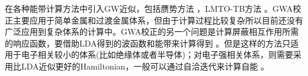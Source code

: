 {在各种能带计算方法中引入GW近似，包括赝势方法%
，LMTO-TB方法%
。GWA校正主要应用于简单金属和过渡金属体系，但由于计算过程比较复杂所以目前还没有广泛应用到复杂体系的计算中。GWA校正的另一个问题是计算屏蔽相互作用所需的响应函数，要借助LDA得到的波函数和能带来计算得到%
。但是这样的方法只适用于电子相关较小的体系(比如绝缘体或者半导体)；对电子强相关体系，则需要采用比LDA近似更好的Hamiltonian，一般可以通过自洽迭代来计算自能%
。

%
}
